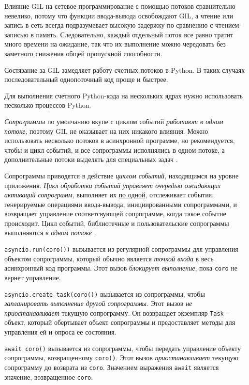 \documentclass[%
	11pt,
	a4paper,
	utf8,
		]{article}
\begin{document}
Влияние GIL на сетевое программирование с помощью потоков сравнительно невелико, потому что функции ввода-вывода освобождают GIL, а чтение или запись в сеть всегда подразумевает высокую задержку по сравнению с чтением-записью в память. Следовательно, каждый отдельный поток все равно тратит много времени на ожидание, так что их выполнение можно чередовать без заметного снижения общей пропускной способности.

Состязание за GIL замедляет работу счетных потоков в Python. В таких случаях последовательный однопоточный код проще и быстрее.

Для выполнения счетного Python-кода на нескольких ядрах нужно использовать несколько процессов Python.

\emph{Сопрограммы} по умолчанию вкупе с циклом событий \emph{работают в одном потоке}, поэтому GIL не оказывает на них никакого влияния. Можно использовать несколько потоков в асинхронной программе, но рекомендуется, чтобы и цикл событий, и все сопрограммы исполнялись в одном потоке, а дополнительные потоки выделять для специальных задач \cite[]{ramalho:python-2022}.

Сопрограммы приводятся в действие \emph{циклом событий}, находящимся на уровне приложения. \emph{\color{blue}Цикл обработки событий управляет очередью ожидающих активаций сопрограмм}, выполняет их \underline{по одной}, отслеживает события, генерируемые операциями ввода-вывода, инициированными сопрограммами, и возвращает управление соответсвующей сопрограмме, когда такое событие происходит. Цикл событий, библиотечные и пользовательские сопрограммы выполняются \emph{в одном потоке} \cite[]{ramalho:python-2022}.

\verb|asyncio.run(coro())| вызывается из регулярной сопрограммы для управления объектом сопрограммы, который обычно является \emph{точкой входа} в весь асинхронный код программы. Этот вызов \emph{блокирует выполнение}, пока \verb*|coro| не вернет управление. 

\verb|asyncio.create_task(coro())| вызывается из сопрограммы, чтобы \emph{запланировать выполнение другой сопрограммы}. Этот вызов \emph{не приостанавливает} текущую сопрограмму. Он возвращает экземпляр \verb*|Task| -- объект, который обертывает объект сопрограммы и предоставляет методы для управления ей и опроса ее состояния.

\verb|await coro()| вызывается из сопрограммы, чтобы передать управление объекту сопрограммы, возвращенному \verb*|coro()|. Этот вызов \emph{приостанавливает} текущую сопрограмму до возврата из \verb|coro|. Значением выражения \verb*|await| является значение, возвращенное \verb|coro|.
\end{document}
